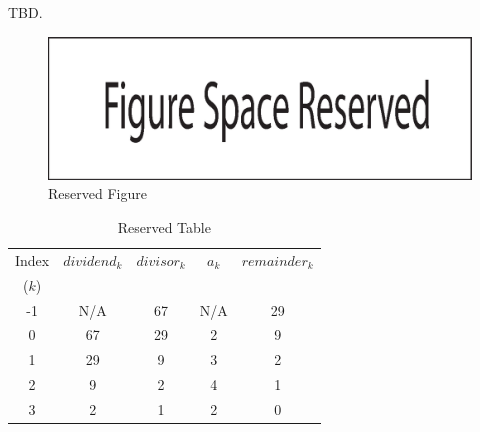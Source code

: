 TBD.


\begin{figure}
\centering
\includegraphics[width=4.6in]{common/figure_reserved.eps}
\caption{Reserved Figure}
\label{fig:siov0:01}
\end{figure}

\begin{table}
\caption{Reserved Table}
\label{tbl:siov0:01}
\begin{center}
\begin{tabular}{|c|c|c|c|c|}
\hline
\small{Index} & \small{$dividend_k$}  & \small{$divisor_k$} & \small{$a_k$}   & \small{$remainder_k$} \\
\small{($k$)} &                       &                     &                 &                       \\
\hline
\hline
\small{-1}    & \small{N/A}           & \small{67}          & \small{N/A}     & \small{29}            \\
\hline
\small{0}     & \small{67}            & \small{29}          & \small{2}       & \small{9}             \\
\hline
\small{1}     & \small{29}            & \small{9}           & \small{3}       & \small{2}             \\
\hline
\small{2}     & \small{9}             & \small{2}           & \small{4}       & \small{1}             \\
\hline
\small{3}     & \small{2}             & \small{1}           & \small{2}       & \small{0}             \\
\hline
\end{tabular}
\end{center}
\end{table}

